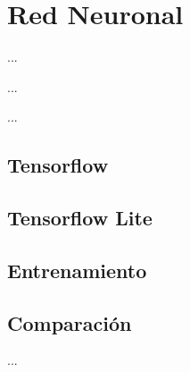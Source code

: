 %
%

\chapter{Red Neuronal}

\begin{FraseCelebre}
\begin{Frase}
...
\end{Frase}
\begin{Fuente}
...
\end{Fuente}
\end{FraseCelebre}

\begin{resumen}
...
\end{resumen}


\section{Tensorflow}
\label{cap4:sec:tensorflow}

\section{Tensorflow Lite}
\label{cap4:sec:tensorflow-lite}


\section{Entrenamiento}
\label{cap4:sec:entrenamiento}


\section{Comparación}
\label{cap4:sec:comparación}


...

